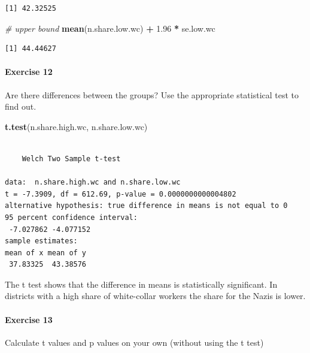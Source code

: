 \documentclass[]{article}
\newenvironment{Shaded}{\begin{snugshade}}{\end{snugshade}}
\newcommand{\KeywordTok}[1]{\textcolor[rgb]{0.13,0.29,0.53}{\textbf{#1}}}
\newcommand{\FloatTok}[1]{\textcolor[rgb]{0.00,0.00,0.81}{#1}}
\newcommand{\StringTok}[1]{\textcolor[rgb]{0.31,0.60,0.02}{#1}}
\newcommand{\CommentTok}[1]{\textcolor[rgb]{0.56,0.35,0.01}{\textit{#1}}}
\newcommand{\OperatorTok}[1]{\textcolor[rgb]{0.81,0.36,0.00}{\textbf{#1}}}
\newcommand{\NormalTok}[1]{#1}
\let\oldparagraph\paragraph
\renewcommand{\paragraph}[1]{\oldparagraph{#1}\mbox{}}
\theoremstyle{definition}
\theoremstyle{definition}
\theoremstyle{definition}
\theoremstyle{remark}
\begin{document}
\begin{verbatim}
[1] 42.32525
\end{verbatim}

\begin{Shaded}
\begin{Highlighting}[]
\CommentTok{# upper bound}
\KeywordTok{mean}\NormalTok{(n.share.low.wc) }\OperatorTok{+}\StringTok{ }\FloatTok{1.96} \OperatorTok{*}\StringTok{ }\NormalTok{se.low.wc}
\end{Highlighting}
\end{Shaded}

\begin{verbatim}
[1] 44.44627
\end{verbatim}

\paragraph{Exercise 12}\label{exercise-12-2}

Are there differences between the groups? Use the appropriate
statistical test to find out.

\begin{Shaded}
\begin{Highlighting}[]
\KeywordTok{t.test}\NormalTok{(n.share.high.wc, n.share.low.wc)}
\end{Highlighting}
\end{Shaded}

\begin{verbatim}

    Welch Two Sample t-test

data:  n.share.high.wc and n.share.low.wc
t = -7.3909, df = 612.69, p-value = 0.0000000000004802
alternative hypothesis: true difference in means is not equal to 0
95 percent confidence interval:
 -7.027862 -4.077152
sample estimates:
mean of x mean of y 
 37.83325  43.38576 
\end{verbatim}

The t test shows that the difference in means is statistically
significant. In districts with a high share of white-collar workers the
share for the Nazis is lower.

\paragraph{Exercise 13}\label{exercise-13-2}

Calculate t values and p values on your own (without using the t test)
\end{document}
